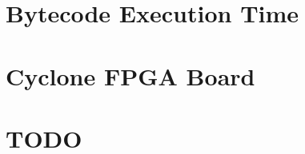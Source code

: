 \chapter{Bytecode Execution Time} \label{appx:bytecode}


%

%


\chapter{Cyclone FPGA Board} \label{appx:cycore}


%




\printindex

\chapter{TODO}




